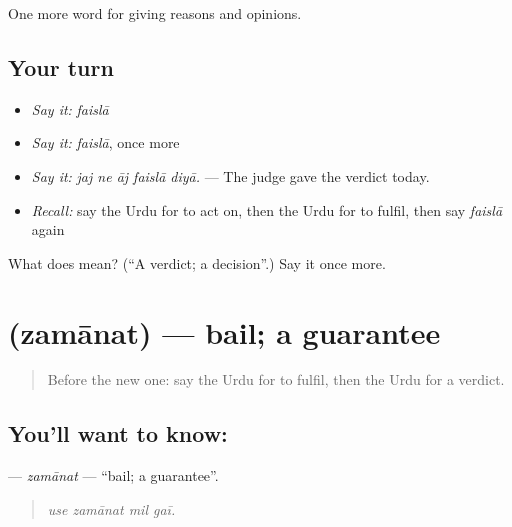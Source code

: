 \begin{grammarlens}[title={What you've built}]
One more word for giving reasons and opinions.
\end{grammarlens}

\subsection*{Your turn}
\begin{itemize}
\raggedright
  \item \emph{Say it:} \emph{faislā}
  \item \emph{Say it:} \emph{faislā}, once more
  \item \emph{Say it:} \emph{jaj ne āj faislā diyā.} — The judge gave the verdict today.
  \item \emph{Recall:} say the Urdu for to act on, then the Urdu for to fulfil, then say \emph{faislā} again
\end{itemize}

\begin{tcolorbox}[breakable,colback=teal!4,colframe=teal!35!black,title={Before you move on}]
What does  mean? (\textquotedblleft{}A verdict; a decision\textquotedblright{}.) Say it once more.
\end{tcolorbox}
\section[\texorpdfstring{\ur{ضمانت} (zamānat)}{ضمانت (zamānat)}]{ (zamānat) — bail; a guarantee}

\label{lesson:UR-C340-zamanat}



\begin{quote}
Before the new one: say the Urdu for to fulfil, then the Urdu for a verdict.
\end{quote}

\subsection*{You'll want to know: }
\textbf{} — \emph{zamānat} — \textquotedblleft{}bail; a guarantee\textquotedblright{}.

\begin{quote}
   
\end{quote}

\begin{quote}
\emph{use zamānat mil gaī.}
\end{quote}

